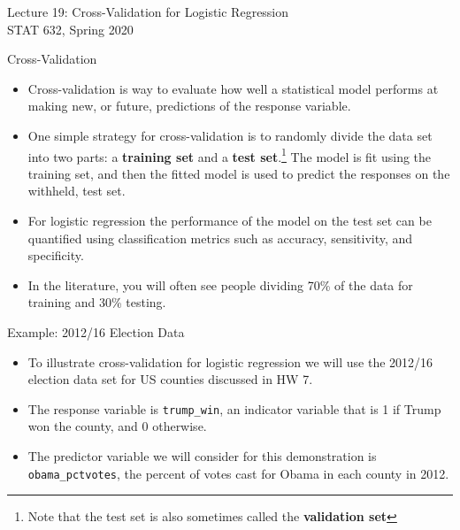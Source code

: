 \documentclass[10pt]{beamer}\usepackage[]{graphicx}\usepackage[]{color}
\begin{document}
\setlength\parindent{0pt}

\begin{frame}
\large
Lecture 19: Cross-Validation for Logistic Regression\\
STAT 632, Spring 2020\\
\end{frame}

\begin{frame}{Cross-Validation}
\begin{itemize}
\item Cross-validation is way to evaluate how well a statistical model performs at making new, or future, predictions of the response variable.
\vspace{5pt}
\item One simple strategy for cross-validation is to randomly divide the data set into two parts: a \textbf{training set} and a \textbf{test set}.\footnote{Note  that the test set is also sometimes called the \textbf{validation set}}  The model is fit using the training set, and then the fitted model is used to predict the responses on the withheld, test set.
\vspace{5pt}
\item For logistic regression the performance of the model on the test set can be quantified using classification metrics such as accuracy, sensitivity, and specificity.
\vspace{5pt}
\item In the literature, you will often see people dividing 70\% of the data for training and 30\% testing.
\end{itemize}
\end{frame}


\begin{frame}{Example: 2012/16 Election Data}
\begin{itemize}
\item To illustrate cross-validation for logistic regression we will use the 2012/16 election data set for US counties discussed in HW 7.
\vspace{10pt}
\item The response variable is \texttt{trump\_win}, an indicator variable that is 1 if Trump won the county, and 0 otherwise.
\vspace{10pt}
\item The predictor variable we will consider for this demonstration is \texttt{obama\_pctvotes}, the percent of votes cast for Obama in each county in 2012.
\end{itemize}
\end{frame}
\end{document}
